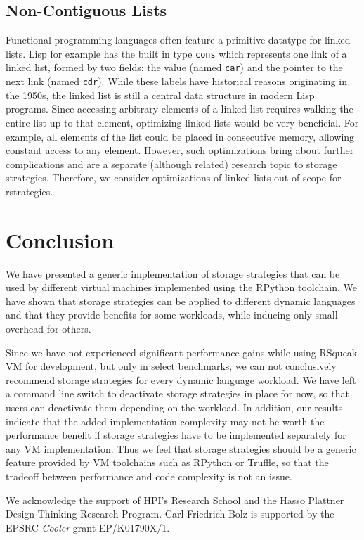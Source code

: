 \documentclass[english,10pt]{sigplanconf}
\begin{document}

\subsection{Non-Contiguous Lists}

Functional programming languages often feature a primitive datatype
for linked lists.  Lisp for example has the built in type
\lstinline{cons} which represents one link of a linked list, formed by
two fields: the value (named \lstinline{car}) and the pointer to the
next link (named \lstinline{cdr}).  While these labels have historical
reasons originating in the 1950s, the linked list is still a central
data structure in modern Lisp programs.  Since accessing arbitrary
elements of a linked list requires walking the entire list up to that
element, optimizing linked lists would be very beneficial.  For
example, all elements of the list could be placed in consecutive
memory, allowing constant access to any element.  However, such
optimizations bring about further complications and are a separate
(although related) research topic to storage strategies.  Therefore,
we consider optimizations of linked lists out of scope for
rstrategies.


\section{Conclusion}

We have presented a generic implementation of storage strategies
that can be used by different virtual machines implemented using the 
RPython
toolchain. We have shown that storage strategies can be applied to
different dynamic languages and that they provide benefits for some workloads, 
while inducing only small overhead for others.

Since we have not experienced significant performance gains while using 
RSqueak VM for development, but only in select benchmarks, we can
not conclusively recommend storage strategies for every dynamic language
workload. We have left a command
line switch to deactivate storage strategies in place for now,
so that users can deactivate them depending on the
workload. In addition, our results indicate
that the added implementation complexity may not be worth 
the performance benefit if storage strategies have to be implemented
separately for any VM implementation. Thus we feel that storage strategies should
be a generic feature provided by VM toolchains such as RPython or Truffle,
so that the tradeoff between performance and code complexity is not an issue.

\acks
We acknowledge the support of HPI's Research School and
the Hasso Plattner Design Thinking Research Program. Carl Friedrich
Bolz is supported by the EPSRC \emph{Cooler} grant EP/K01790X/1.


\balance



\end{document}
